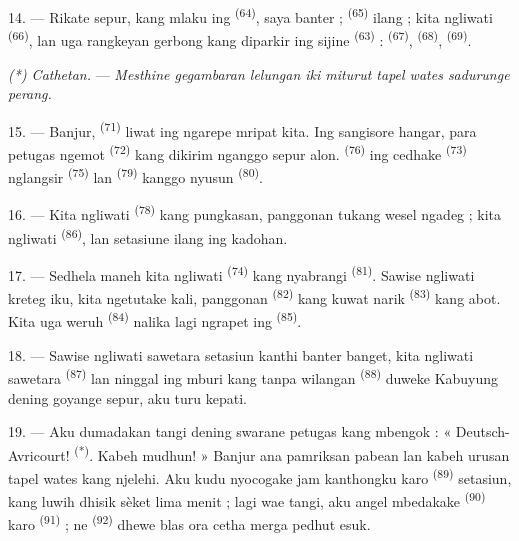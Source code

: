 \VUsaut{3.0mm}
\VUsaut{3.0mm}

14. --- Rikate sepur, kang mlaku ing  \textsuperscript{(64)},
saya banter ;  \textsuperscript{(65)} ilang ; kita ngliwati
 \textsuperscript{(66)}, lan uga rangkeyan gerbong kang
diparkir ing  sijine \textsuperscript{(63)} :
 \textsuperscript{(67)}, 
\textsuperscript{(68)},  \textsuperscript{(69)}.

\textit{(*) Cathetan.} --- \textit{Mesthine gegambaran lelungan iki
miturut tapel wates sadurunge perang.}

15. --- Banjur,  \textsuperscript{(71)} liwat ing
ngarepe mripat kita. Ing sangisore hangar, para petugas ngemot
 \textsuperscript{(72)} kang dikirim nganggo sepur alon.
 \textsuperscript{(76)} ing cedhake
 \textsuperscript{(73)} nglangsir  \textsuperscript{(75)} lan 
\textsuperscript{(79)} kanggo nyusun 
\textsuperscript{(80)}.

16. --- Kita ngliwati  \textsuperscript{(78)} kang
pungkasan, panggonan tukang wesel ngadeg ; kita ngliwati  \textsuperscript{(86)}, lan setasiune ilang ing kadohan.

17. --- Sedhela maneh kita ngliwati 
\textsuperscript{(74)} kang nyabrangi 
\textsuperscript{(81)}. Sawise ngliwati kreteg iku, kita ngetutake kali,
panggonan  \textsuperscript{(82)} kang kuwat narik
 \textsuperscript{(83)} kang abot. Kita uga weruh
 \textsuperscript{(84)} nalika lagi ngrapet ing
 \textsuperscript{(85)}.

18. --- Sawise ngliwati sawetara setasiun kanthi banter banget, kita
ngliwati sawetara  \textsuperscript{(87)} lan ninggal
ing mburi  kang tanpa wilangan \textsuperscript{(88)}
duweke  Kabuyung dening goyange sepur, aku turu
kepati.

\VUsaut{3.0mm}
\VUsaut{3.0mm}

19. --- Aku dumadakan tangi dening swarane petugas kang mbengok :
« Deutsch-Avricourt! \textsuperscript{(*)}. Kabeh mudhun! » Banjur ana
pamriksan pabean lan kabeh urusan tapel wates kang njelehi. Aku kudu
nyocogake jam kanthongku karo  \textsuperscript{(89)}
setasiun, kang luwih dhisik sèket lima menit ; lagi wae tangi, aku
angel mbedakake  \textsuperscript{(90)} karo
 \textsuperscript{(91)} ; ne
\textsuperscript{(92)} dhewe blas ora cetha merga pedhut esuk.

